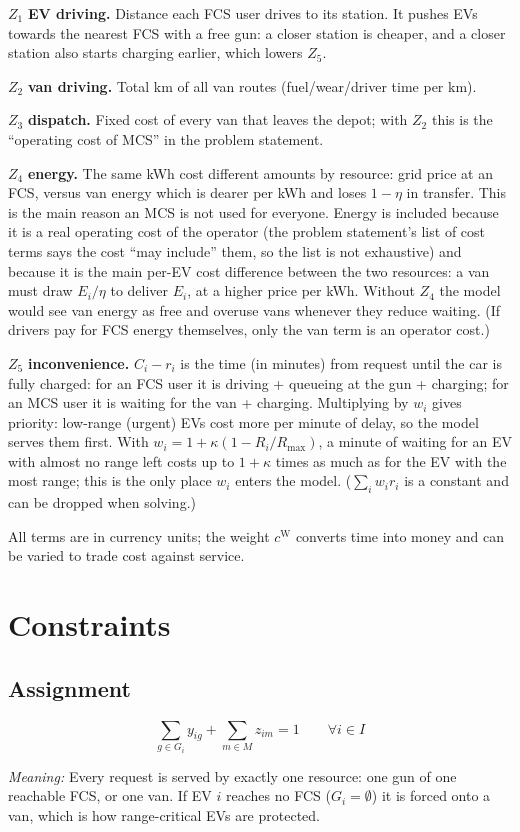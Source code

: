 \documentclass[12pt,a4paper]{article}
\newcommand{\mdesc}[1]{\par{\textit{Meaning:} #1}\par}
\begin{document}
$Z_1$ \textbf{EV driving.} Distance each FCS user drives to its station. It pushes EVs towards the nearest FCS with a free gun: a closer station is cheaper, and a closer station also starts charging earlier, which lowers $Z_5$.

$Z_2$ \textbf{van driving.} Total km of all van routes (fuel/wear/driver time per km).

$Z_3$ \textbf{dispatch.} Fixed cost of every van that leaves the depot; with $Z_2$ this is the ``operating cost of MCS'' in the problem statement.

$Z_4$ \textbf{energy.} The same kWh cost different amounts by resource: grid price at an FCS, versus van energy which is dearer per kWh and loses $1-\eta$ in transfer. This is the main reason an MCS is not used for everyone. Energy is included because it is a real operating cost of the operator (the problem statement's list of cost terms says the cost ``may include'' them, so the list is not exhaustive) and because it is the main per-EV cost difference between the two resources: a van must draw $E_i/\eta$ to deliver $E_i$, at a higher price per kWh. Without $Z_4$ the model would see van energy as free and overuse vans whenever they reduce waiting. (If drivers pay for FCS energy themselves, only the van term is an operator cost.)

$Z_5$ \textbf{inconvenience.} $C_i-r_i$ is the time (in minutes) from request until the car is fully charged: for an FCS user it is driving + queueing at the gun + charging; for an MCS user it is waiting for the van + charging. Multiplying by $w_i$ gives priority: low-range (urgent) EVs cost more per minute of delay, so the model serves them first. With $w_i=1+\kappa(1-R_i/R_{\max})$, a minute of waiting for an EV with almost no range left costs up to $1+\kappa$ times as much as for the EV with the most range; this is the only place $w_i$ enters the model. ($\sum_i w_ir_i$ is a constant and can be dropped when solving.)

All terms are in currency units; the weight $c^{\mathrm W}$ converts time into money and can be varied to trade cost against service.

\section{Constraints}

\subsection{Assignment}
\begin{equation}
\sum_{g\in G_i}y_{ig}+\sum_{m\in M}z_{im}=1\qquad\forall i\in I \label{eq:assign}
\end{equation}
\mdesc{Every request is served by exactly one resource: one gun of one reachable FCS, or one van. If EV $i$ reaches no FCS ($G_i=\emptyset$) it is forced onto a van, which is how range-critical EVs are protected.}
\end{document}
